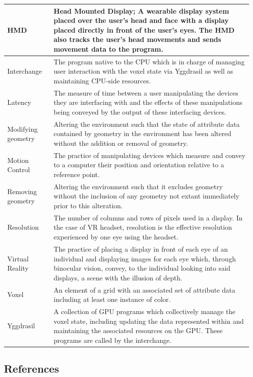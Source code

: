 \documentclass[onecolumn, draftclsnofoot,10pt, compsoc]{IEEEtran}
\begin{document}
\begin{longtable}{ | l | p{12cm} | }
HMD & Head Mounted Display; A wearable display system placed over the user’s head and face with a display placed directly in front of the user’s eyes. The HMD also tracks the user’s head movements and sends movement data to the program.  \\ \hline
 Interchange & The program native to the CPU which is in charge of managing user interaction with the voxel state via Yggdrasil as well as maintaining CPU-side resources. \\ \hline
Latency & The measure of time between a user manipulating the devices they are interfacing with and the effects of these manipulations being conveyed by the output of these interfacing devices. \\ \hline
Modifying geometry & Altering the environment such that the state of attribute data contained by geometry in the environment has been altered without the addition or removal of geometry.  \\ \hline
Motion Control & The practice of manipulating devices which measure and convey to a computer their position and orientation relative to a reference point.  \\ \hline
Removing geometry & Altering the environment such that it excludes geometry without the inclusion of any geometry not extant immediately prior to this alteration.  \\ \hline
Resolution & The number of columns and rows of pixels used in a display. In the case of  VR headset, resolution is the effective resolution experienced by one eye using the headset. \\ \hline
Virtual Reality & The practice of placing a display in front of each eye of an individual and displaying images for each eye which, through binocular vision, convey, to the individual looking into said displays, a scene with the illusion of depth.  \\ \hline
Voxel & An element of a grid with an associated set of attribute data including at least one instance of color.  \\ \hline
Yggdrasil & A collection of GPU programs which collectively manage the voxel state, including updating the data represented within and maintaining the associated resources on the GPU. These programs are called by the interchange. \\ \hline
 
\hline 
\end{longtable}

\subsection{References}

{}
\end{document}
